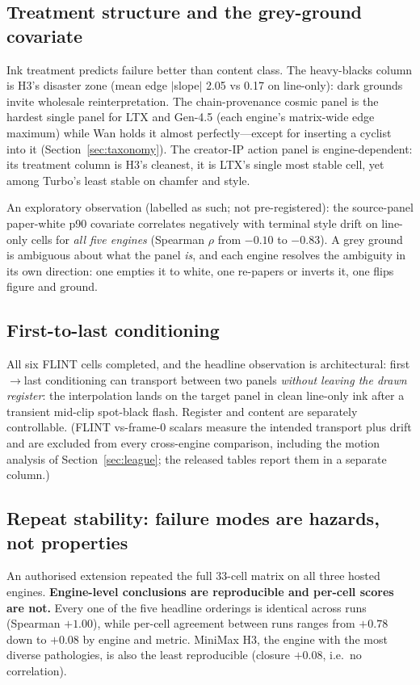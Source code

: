 \documentclass[11pt]{article}
\begin{document}
\subsection{Treatment structure and the grey-ground covariate}

Ink treatment predicts failure better than content class. The heavy-blacks
column is H3's disaster zone (mean edge $|$slope$|$ 2.05 vs 0.17 on
line-only): dark grounds invite wholesale reinterpretation. The
chain-provenance cosmic panel is the hardest single panel for LTX and
Gen-4.5 (each engine's matrix-wide edge maximum) while Wan holds it almost
perfectly---except for inserting a cyclist into it
(Section~\ref{sec:taxonomy}). The creator-IP action panel is
engine-dependent: its treatment column is H3's cleanest, it is LTX's single most stable
cell, yet among Turbo's least stable on chamfer and style.

An exploratory observation (labelled as such; not pre-registered): the source-panel
paper-white p90 covariate correlates negatively with terminal style drift
on line-only cells for \emph{all five engines} (Spearman $\rho$ from $-0.10$
to $-0.83$). A grey ground is ambiguous about what the panel \emph{is}, and
each engine resolves the ambiguity in its own direction: one empties it
to white, one re-papers or inverts it, one flips figure and ground.

\subsection{First-to-last conditioning}

All six FLINT cells completed, and the headline observation is
architectural: first$\to$last conditioning can transport between two panels
\emph{without leaving the drawn register}: the interpolation lands on the
target panel in clean line-only ink after a transient mid-clip spot-black
flash. Register and content are separately controllable. (FLINT
vs-frame-0 scalars measure the intended transport plus drift and are
excluded from every cross-engine comparison, including the motion analysis
of Section~\ref{sec:league}; the released tables report them in a separate
column.)

\subsection{Repeat stability: failure modes are hazards, not properties}
\label{sec:repeat}

An authorised extension repeated the full 33-cell matrix on all three hosted
engines. \textbf{Engine-level conclusions are reproducible and per-cell
scores are not.} Every one of the five headline orderings is identical
across runs (Spearman $+1.00$), while per-cell agreement between runs ranges
from $+0.78$ down to $+0.08$ by engine and metric. MiniMax H3, the engine
with the most diverse pathologies, is also the least reproducible
(closure $+0.08$, i.e.\ no correlation).
\end{document}
